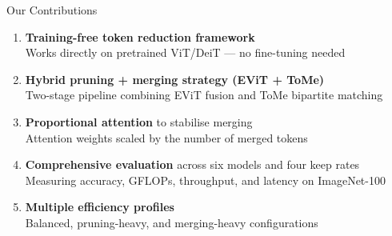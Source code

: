 \documentclass[aspectratio=169, 11pt]{beamer}
\begin{document}
\begin{frame}{Our Contributions}
\begin{enumerate}
  \item \textbf{Training-free token reduction framework}\\
        Works directly on pretrained ViT/DeiT — no fine-tuning needed
  \item \textbf{Hybrid pruning + merging strategy (EViT + ToMe)}\\
        Two-stage pipeline combining EViT fusion and ToMe bipartite matching
  \item \textbf{Proportional attention} to stabilise merging\\
        Attention weights scaled by the number of merged tokens
  \item \textbf{Comprehensive evaluation} across six models and four keep rates\\
        Measuring accuracy, GFLOPs, throughput, and latency on ImageNet-100
  \item \textbf{Multiple efficiency profiles}\\
        Balanced, pruning-heavy, and merging-heavy configurations
\end{enumerate}
\end{frame}
\end{document}
